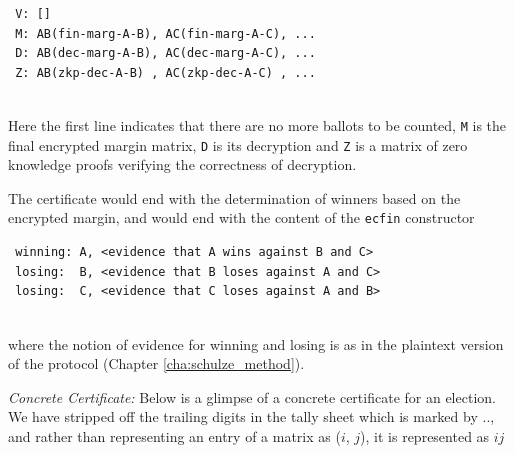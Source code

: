  {\small\begin{verbatim}
 V: []
 M: AB(fin-marg-A-B), AC(fin-marg-A-C), ...
 D: AB(dec-marg-A-B), AC(dec-marg-A-C), ...
 Z: AB(zkp-dec-A-B) , AC(zkp-dec-A-C) , ...
 \end{verbatim}}

 \mbox{}\\[-5ex]
 Here the first line indicates that there are no more ballots to be
 counted, \texttt{M} is the final encrypted margin matrix,
 \texttt{D} is its decryption and \texttt{Z} is a matrix of zero
 knowledge proofs verifying the correctness of decryption.

 The certificate would end with the determination of winners based
 on the encrypted margin, and would end with the content of the
 \texttt{ecfin} constructor

 {\small\begin{verbatim}
 winning: A, <evidence that A wins against B and C>
 losing:  B, <evidence that B loses against A and C>
 losing:  C, <evidence that C loses against A and B>
 \end{verbatim}}

 \mbox{}\\[-5ex]
 where the notion of evidence for winning and losing is as in the
 plaintext version of the protocol (Chapter \ref{cha:schulze_method}).  
 
 \noindent
 \textit{Concrete Certificate:} Below is a glimpse of a concrete certificate for an election. 
We have stripped off 
the trailing digits in the tally sheet which is marked by $..$, and rather 
 than representing an entry of a matrix as ($i$, $j$), it is represented as 
 $ij$

